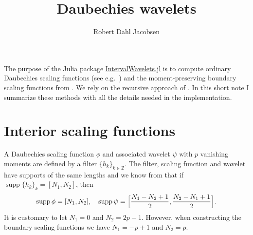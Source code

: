 \documentclass[a4paper]{scrartcl}
\title{Daubechies wavelets}
\author{Robert Dahl Jacobsen}
\newcommand\Z{\ensuremath{\mathbb{Z}}}
\DeclareMathOperator\supp{supp}
\begin{document}
\maketitle

The purpose of the Julia package \href{https://github.com/robertdj/IntervalWavelets.jl}{IntervalWavelets.jl} is to compute ordinary Daubechies scaling functions (see e.g.\ \cite{Mallat:2009}) and the moment-preserving boundary scaling functions from \cite{Cohen:Daubechies:Vial:1993}.
We rely on the recursive approach of \cite{Strang:1989}.
In this short note I summarize these methods with all the details needed in the implementation.


\section{Interior scaling functions}
\label{sec:internal}

A Daubechies scaling function $\phi$ and associated wavelet $\psi$ with $p$ vanishing moments are defined by a filter $\{h_k\}_{k\in\Z}$.
The filter, scaling function and wavelet have supports of the same lengths and we know from \cite[Theorem 7.5]{Mallat:2009} that if $\supp \{h_k\}_k = [N_1, N_2]$, then 
\begin{equation*}
	\supp\phi = [N_1, N_2],
	\quad
	\supp\psi = \Bigl[\frac{N_1 - N_2 + 1}2, \frac{N_2 - N_1 + 1}2\Bigr].
\end{equation*}
It is customary to let $N_1 = 0$ and $N_2 = 2p - 1$.
However, when constructing the boundary scaling functions we have $N_1 = -p+1$ and $N_2 = p$.
\end{document}
